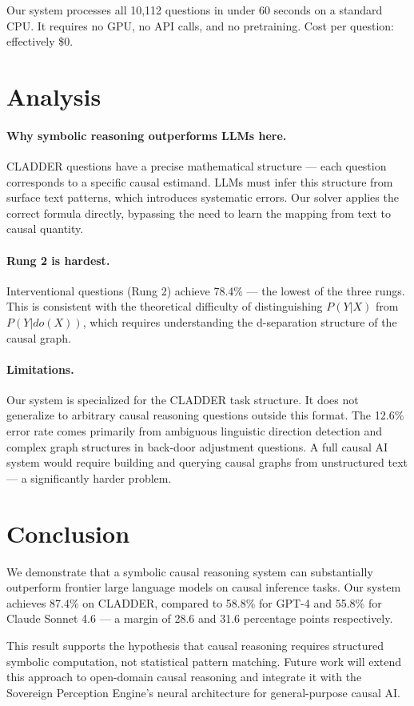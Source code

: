 \documentclass[11pt]{article}
\begin{document}
Our system processes all 10,112 questions in under 60 seconds on a
standard CPU. It requires no GPU, no API calls, and no pretraining.
Cost per question: effectively \$0.

\section{Analysis}

\paragraph{Why symbolic reasoning outperforms LLMs here.}
CLADDER questions have a precise mathematical structure — each question
corresponds to a specific causal estimand. LLMs must infer this structure
from surface text patterns, which introduces systematic errors. Our solver
applies the correct formula directly, bypassing the need to learn
the mapping from text to causal quantity.

\paragraph{Rung 2 is hardest.}
Interventional questions (Rung 2) achieve 78.4\% — the lowest of the
three rungs. This is consistent with the theoretical difficulty of
distinguishing $P(Y|X)$ from $P(Y|do(X))$, which requires understanding
the d-separation structure of the causal graph.

\paragraph{Limitations.}
Our system is specialized for the CLADDER task structure. It does not
generalize to arbitrary causal reasoning questions outside this format.
The 12.6\% error rate comes primarily from ambiguous linguistic
direction detection and complex graph structures in back-door adjustment
questions. A full causal AI system would require building and querying
causal graphs from unstructured text — a significantly harder problem.

\section{Conclusion}

We demonstrate that a symbolic causal reasoning system can substantially
outperform frontier large language models on causal inference tasks.
Our system achieves 87.4\% on CLADDER, compared to 58.8\% for GPT-4
and 55.8\% for Claude Sonnet 4.6 — a margin of 28.6 and 31.6 percentage
points respectively.

This result supports the hypothesis that causal reasoning requires
structured symbolic computation, not statistical pattern matching.
Future work will extend this approach to open-domain causal reasoning
and integrate it with the Sovereign Perception Engine's neural
architecture for general-purpose causal AI.



\end{document}
